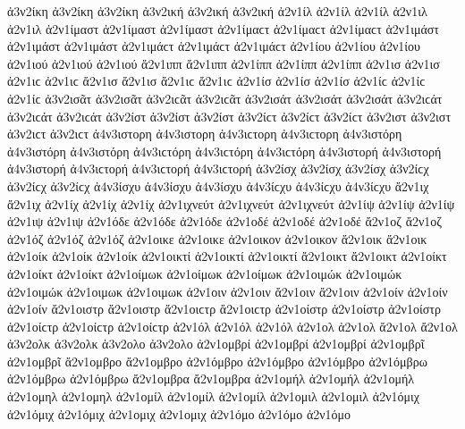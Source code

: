 {ἀ3ν2ίκη ἀ3ν2ίκη ἀ3ν2ίκη   %
ἀ3ν2ική ἀ3ν2ική ἀ3ν2ική 
ἀ2ν1ίλ ἀ2ν1ίλ ἀ2ν1ίλ   %
ἀ2ν1ιλ ἀ2ν1ιλ 
ἀ2ν1ίμαστ ἀ2ν1ίμαστ ἀ2ν1ίμαστ ἀ2ν1ίμαϲτ ἀ2ν1ίμαϲτ ἀ2ν1ίμαϲτ   %
ἀ2ν1ιμάστ ἀ2ν1ιμάστ ἀ2ν1ιμάστ ἀ2ν1ιμάϲτ ἀ2ν1ιμάϲτ ἀ2ν1ιμάϲτ 
ἀ2ν1ίου ἀ2ν1ίου ἀ2ν1ίου   %
ἀ2ν1ιού ἀ2ν1ιού ἀ2ν1ιού 
ἄ2ν1ιππ ἄ2ν1ιππ   %
ἀ2ν1ίππ ἀ2ν1ίππ ἀ2ν1ίππ 
ἀ2ν1ισ ἀ2ν1ισ ἀ2ν1ιϲ ἀ2ν1ιϲ   %
ἄ2ν1ισ ἄ2ν1ισ ἄ2ν1ιϲ ἄ2ν1ιϲ   %
ἀ2ν1ίσ ἀ2ν1ίσ ἀ2ν1ίσ ἀ2ν1ίϲ ἀ2ν1ίϲ ἀ2ν1ίϲ 
ἀ3ν2ισᾶτ ἀ3ν2ισᾶτ ἀ3ν2ιϲᾶτ ἀ3ν2ιϲᾶτ   %
ἀ3ν2ισάτ ἀ3ν2ισάτ ἀ3ν2ισάτ ἀ3ν2ιϲάτ ἀ3ν2ιϲάτ ἀ3ν2ιϲάτ 
ἀ3ν2ίστ ἀ3ν2ίστ ἀ3ν2ίστ ἀ3ν2ίϲτ ἀ3ν2ίϲτ ἀ3ν2ίϲτ   %
ἀ3ν2ιστ ἀ3ν2ιστ ἀ3ν2ιϲτ ἀ3ν2ιϲτ 
ἀ4ν3ιστορη ἀ4ν3ιστορη ἀ4ν3ιϲτορη ἀ4ν3ιϲτορη   %
ἀ4ν3ιστόρη ἀ4ν3ιστόρη ἀ4ν3ιστόρη ἀ4ν3ιϲτόρη ἀ4ν3ιϲτόρη ἀ4ν3ιϲτόρη   %
ἀ4ν3ιστορή ἀ4ν3ιστορή ἀ4ν3ιστορή ἀ4ν3ιϲτορή ἀ4ν3ιϲτορή ἀ4ν3ιϲτορή 
ἀ3ν2ίσχ ἀ3ν2ίσχ ἀ3ν2ίσχ ἀ3ν2ίϲχ ἀ3ν2ίϲχ ἀ3ν2ίϲχ   %
ἀ4ν3ίσχυ ἀ4ν3ίσχυ ἀ4ν3ίσχυ ἀ4ν3ίϲχυ ἀ4ν3ίϲχυ ἀ4ν3ίϲχυ   %
ἄ2ν1ιχ ἄ2ν1ιχ   %
ἀ2ν1ίχ ἀ2ν1ίχ ἀ2ν1ίχ 
ἀ2ν1ιχνεύτ ἀ2ν1ιχνεύτ ἀ2ν1ιχνεύτ   %
ἀ2ν1ίψ ἀ2ν1ίψ ἀ2ν1ίψ   %
ἀ2ν1ιψ ἀ2ν1ιψ 
ἀ2ν1όδε ἀ2ν1όδε ἀ2ν1όδε   %
ἀ2ν1οδέ ἀ2ν1οδέ ἀ2ν1οδέ 
ἄ2ν1οζ ἄ2ν1οζ   %
ἀ2ν1όζ ἀ2ν1όζ ἀ2ν1όζ 
ἀ2ν1οικε ἀ2ν1οικε   %
ἀ2ν1οικον ἀ2ν1οικον   %
ἄ2ν1οικ ἄ2ν1οικ   %
ἀ2ν1οίκ ἀ2ν1οίκ ἀ2ν1οίκ 
ἀ2ν1οικτί ἀ2ν1οικτί ἀ2ν1οικτί   %
ἄ2ν1οικτ ἄ2ν1οικτ   %
ἀ2ν1οίκτ ἀ2ν1οίκτ ἀ2ν1οίκτ 
ἀ2ν1οίμωκ ἀ2ν1οίμωκ ἀ2ν1οίμωκ   %
ἀ2ν1οιμώκ ἀ2ν1οιμώκ ἀ2ν1οιμώκ 
ἀ2ν1οιμωκ ἀ2ν1οιμωκ   %
ἀ2ν1οιν ἀ2ν1οιν   %
ἄ2ν1οιν ἄ2ν1οιν   %
ἀ2ν1οίν ἀ2ν1οίν ἀ2ν1οίν 
ἄ2ν1οιστρ ἄ2ν1οιστρ ἄ2ν1οιϲτρ ἄ2ν1οιϲτρ   %
ἀ2ν1οίστρ ἀ2ν1οίστρ ἀ2ν1οίστρ ἀ2ν1οίϲτρ ἀ2ν1οίϲτρ ἀ2ν1οίϲτρ 
ἀ2ν1όλ ἀ2ν1όλ ἀ2ν1όλ   %
ἀ2ν1ολ ἀ2ν1ολ 
ἄ2ν1ολ ἄ2ν1ολ   %
ἀ3ν2ολκ ἀ3ν2ολκ   %
ἀ3ν2ολο ἀ3ν2ολο   %
ἀ2ν1ομβρί ἀ2ν1ομβρί ἀ2ν1ομβρί   %
ἀ2ν1ομβρῖ ἀ2ν1ομβρῖ 
ἄ2ν1ομβρο ἄ2ν1ομβρο   %
ἀ2ν1όμβρο ἀ2ν1όμβρο ἀ2ν1όμβρο 
ἀ2ν1όμβρω ἀ2ν1όμβρω ἀ2ν1όμβρω 
ἄ2ν1ομβρα ἄ2ν1ομβρα 
ἀ2ν1ομήλ ἀ2ν1ομήλ ἀ2ν1ομήλ   %
ἀ2ν1ομηλ ἀ2ν1ομηλ 
ἀ2ν1ομίλ ἀ2ν1ομίλ ἀ2ν1ομίλ   %
ἀ2ν1ομιλ ἀ2ν1ομιλ 
ἀ2ν1όμιχ ἀ2ν1όμιχ ἀ2ν1όμιχ   %
ἀ2ν1ομιχ ἀ2ν1ομιχ 
ἀ2ν1όμο ἀ2ν1όμο ἀ2ν1όμο   %
}
